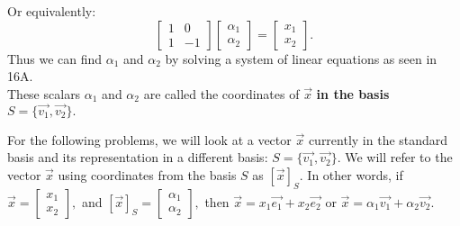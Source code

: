 Or equivalently:
\[
  \begin{bmatrix}
    1 & 0 \\
    1 & -1
  \end{bmatrix}
  \begin{bmatrix} \alpha_1 \\ \alpha_2 \end{bmatrix} = \begin{bmatrix} x_1 \\ x_2 \end{bmatrix}
.\]
Thus we can find $\alpha_1$ and $\alpha_2$ by solving a system of linear equations as seen in 16A. \\
These scalars $\alpha_1$ and $\alpha_2$ are called the coordinates of $\vec{x}$ \textbf{in the basis} $S = \{\vec{v_1}, \vec{v_2} \}.$

For the following problems, we will look at a vector $\vec{x}$ currently in the standard basis 
and its representation in a different basis: $S = \{\vec{v_1}, \vec{v_2} \}.$ \vskip 4pt
We will refer to the vector $\vec{x}$ using coordinates from the basis $S$ as $[\vec{x}]_S.$ In other words, \vskip 3pt 
if $\vec{x} = \begin{bmatrix} x_1 \\ x_2 \end{bmatrix},$ and $[\vec{x}]_S = \begin{bmatrix} \alpha_1 \\ \alpha_2 \end{bmatrix},$ then $\vec{x} = x_1 \vec{e_1} + x_2 \vec{e_2}$ or $\vec{x} = \alpha_1 \vec{v_1} + \alpha_2 \vec{v_2}.$

